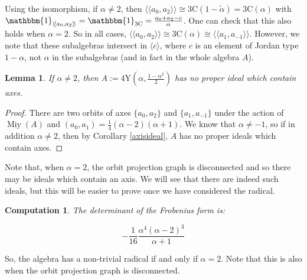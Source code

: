 \documentclass[11pt, a4paper]{article}
\theoremstyle{plain}
\newtheorem{lemma}[theorem]{Lemma}
\newtheorem{computation}[theorem]{Computation}
\theoremstyle{definition}
\newcommand\al{\alpha}
\newcommand\la{\langle}
\newcommand\ra{\rangle}
\newcommand\lla{\langle\!\langle}
\newcommand\rra{\rangle\!\rangle}
\newcommand{\A}{\mathrm{A}}
\newcommand{\C}{\mathrm{C}}
\newcommand{\Y}{\mathrm{Y}}
\DeclareMathOperator{\Miy}{Miy}
\newcommand{\0}{\overline{0}}
\newcommand{\2}{\overline{2}}
\newcommand{\1}{\mathbbm{1}}
\begin{document}
 Using the isomorphism, if $\al \neq 2$, then $\lla a_0, a_2 \rra \cong 3\C(1-\tilde\al) = 3\C(\al)$ with $\1_{\lla a_0, a_2 \rra} = \1_{3\C} = \tfrac{a_0 + a_{2}-c}{\al}$.  One can check that this also holds when $\al = 2$.  So in all cases, $\lla a_0, a_2 \rra \cong 3\C(\al) \cong \lla a_1, a_{-1} \rra$.    However, we note that these subalgebras intersect in $\la c \ra$, where $c$ is an element of Jordan type $1-\al$, not $\al$ in the subalgebras (and in fact in the whole algebra $A$).

\begin{lemma}
If $\al \neq 2$, then $A:= 4\Y(\al, \tfrac{1-\al^2}{2})$ has no proper ideal which contain axes.
\end{lemma}
\begin{proof}
There are two orbits of axes $\{a_0,a_2\}$ and $\{a_1,a_{-1}\}$ under the action of $\Miy(A)$ and $(a_0, a_1) =  \tfrac{1}{4} (\al-2)(\al+1)$.  We know that $\al \neq -1$, so if in addition $\al \neq 2$, then by Corollary \ref{axisideal}, $A$ has no proper ideals which contain axes.  
\end{proof}

Note that, when $\al = 2$, the orbit projection graph is disconnected and so there may be ideals which contain an axis.  We will see that there are indeed such ideals, but this will be easier to prove once we have considered the radical.

\begin{computation}
	The determinant of the Frobenius form is:
	
	\[
	-\frac{1}{16}  \frac{\al^4  (\al - 2)^3}{\al + 1}
	\]
\end{computation}

So, the algebra has a non-trivial radical if and only if $\al = 2$.  Note that this is also when the orbit projection graph is disconnected.
\end{document}
